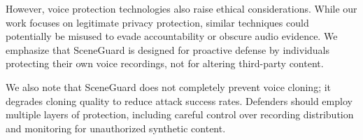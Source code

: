 However, voice protection technologies also raise ethical considerations. While our work focuses on legitimate privacy protection, similar techniques could potentially be misused to evade accountability or obscure audio evidence. We emphasize that SceneGuard is designed for proactive defense by individuals protecting their own voice recordings, not for altering third-party content.

We also note that SceneGuard does not completely prevent voice cloning; it degrades cloning quality to reduce attack success rates. Defenders should employ multiple layers of protection, including careful control over recording distribution and monitoring for unauthorized synthetic content.

